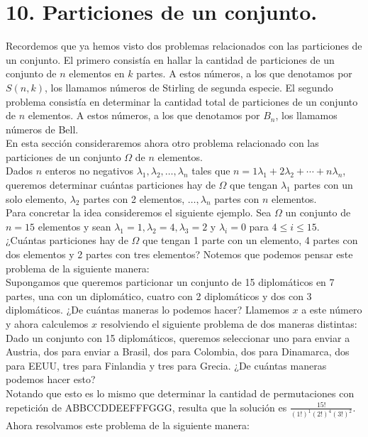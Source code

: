 \documentclass[10pt]{article}
\begin{document}
\section*{10. Particiones de un conjunto.}
Recordemos que ya hemos visto dos problemas relacionados con las particiones de un conjunto. El primero consistía en hallar la cantidad de particiones de un conjunto de $n$ elementos en $k$ partes. A estos números, a los que denotamos por $S(n, k)$, los llamamos números de Stirling de segunda especie. El segundo problema consistía en determinar la cantidad total de particiones de un conjunto de $n$ elementos. A estos números, a los que denotamos por $B_{n}$, los llamamos números de Bell.\\
En esta sección consideraremos ahora otro problema relacionado con las particiones de un conjunto $\Omega$ de $n$ elementos.\\
Dados $n$ enteros no negativos $\lambda_{1}, \lambda_{2}, \ldots, \lambda_{n}$ tales que $n=1 \lambda_{1}+2 \lambda_{2}+\cdots+n \lambda_{n}$, queremos determinar cuántas particiones hay de $\Omega$ que tengan $\lambda_{1}$ partes con un solo elemento, $\lambda_{2}$ partes con 2 elementos, $\ldots, \lambda_{n}$ partes con $n$ elementos.\\
Para concretar la idea consideremos el siguiente ejemplo. Sea $\Omega$ un conjunto de $n=15$ elementos y sean $\lambda_{1}=1, \lambda_{2}=4, \lambda_{3}=2$ y $\lambda_{i}=0$ para $4 \leq i \leq 15$. ¿Cuántas particiones hay de $\Omega$ que tengan 1 parte con un elemento, 4 partes con dos elementos y 2 partes con tres elementos? Notemos que podemos pensar este problema de la siguiente manera:\\
Supongamos que queremos particionar un conjunto de 15 diplomáticos en 7 partes, una con un diplomático, cuatro con 2 diplomáticos y dos con 3 diplomáticos. ¿De cuántas maneras lo podemos hacer? Llamemos $x$ a este número y ahora calculemos $x$ resolviendo el siguiente problema de dos maneras distintas:\\
Dado un conjunto con 15 diplomáticos, queremos seleccionar uno para enviar a Austria, dos para enviar a Brasil, dos para Colombia, dos para Dinamarca, dos para EEUU, tres para Finlandia y tres para Grecia. ¿De cuántas maneras podemos hacer esto?\\
Notando que esto es lo mismo que determinar la cantidad de permutaciones con repetición de ABBCCDDEEFFFGGG, resulta que la solución es $\frac{15!}{(1!)^{1}(2!)^{4}(3!)^{2}}$. Ahora resolvamos este problema de la siguiente manera:
\end{document}
